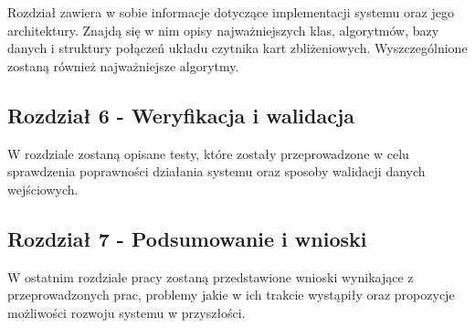 Rozdział zawiera w sobie informacje dotyczące implementacji systemu oraz jego architektury. Znajdą się w nim opisy najważniejszych klas, algorytmów, bazy danych i struktury połączeń układu czytnika kart zbliżeniowych. Wyszczególnione zostaną również najważniejsze algorytmy.

\subsection*{Rozdział 6 - Weryfikacja i walidacja}

W rozdziale zostaną opisane testy, które zostały przeprowadzone w celu sprawdzenia poprawności działania systemu oraz sposoby walidacji danych wejściowych.

\subsection*{Rozdział 7 - Podsumowanie i wnioski}

W ostatnim rozdziale pracy zostaną przedstawione wnioski wynikające z przeprowadzonych prac, problemy jakie w ich trakcie wystąpiły oraz propozycje możliwości rozwoju systemu w przyszłości.


